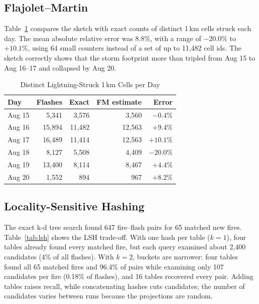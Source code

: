 \documentclass[10pt,journal,compsoc]{IEEEtran}
\begin{document}
\subsection{Flajolet--Martin}
Table~\ref{tab:fm} compares the sketch with exact counts of distinct 1\,km cells struck each day. The mean absolute relative error was 8.8\%, with a range of $-20.0\%$ to $+10.1\%$, using 64 small counters instead of a set of up to 11,482 cell ids. The sketch correctly shows that the storm footprint more than tripled from Aug 15 to Aug 16--17 and collapsed by Aug 20.

\begin{table}[!t]
\caption{Distinct Lightning-Struck 1\,km Cells per Day}
\label{tab:fm}
\centering
\small
\begin{tabular}{@{}lrrrr@{}}
\toprule
Day & Flashes & Exact & FM estimate & Error \\
\midrule
Aug 15 & 5,341 & 3,576 & 3,560 & $-0.4\%$ \\
Aug 16 & 15,894 & 11,482 & 12,563 & $+9.4\%$ \\
Aug 17 & 16,489 & 11,414 & 12,563 & $+10.1\%$ \\
Aug 18 & 8,127 & 5,508 & 4,409 & $-20.0\%$ \\
Aug 19 & 13,400 & 8,114 & 8,467 & $+4.4\%$ \\
Aug 20 & 1,552 & 894 & 967 & $+8.2\%$ \\
\bottomrule
\end{tabular}
\end{table}

\subsection{Locality-Sensitive Hashing}
The exact k-d tree search found 647 fire--flash pairs for 65 matched new fires. Table~\ref{tab:lsh} shows the LSH trade-off. With one hash per table ($k = 1$), four tables already found every matched fire, but each query examined about 2,400 candidates (4\% of all flashes). With $k = 2$, buckets are narrower: four tables found all 65 matched fires and 96.4\% of pairs while examining only 107 candidates per fire (0.18\% of flashes), and 16 tables recovered every pair. Adding tables raises recall, while concatenating hashes cuts candidates; the number of candidates varies between runs because the projections are random.
\end{document}
